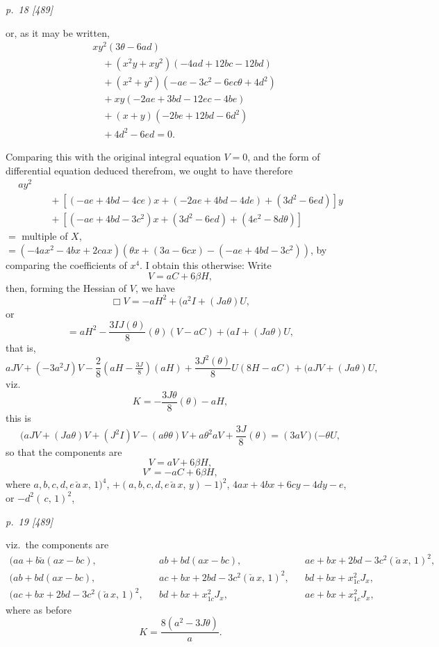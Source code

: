 ﻿\documentclass[11pt,a4paper]{article}
\theoremstyle{plain}
\theoremstyle{definition}
\begin{document}
\clearpage

\bigskip
\textit{p.~18 [489]}
\smallskip

or, as it may be written,
\begin{align*}
&xy^2(3\theta - 6ad)\\
&\quad + (x^2y+xy^2)(-4ad + 12bc - 12bd)\\
&\quad + (x^2+y^2)(-ae - 3c^2 - 6ec\theta + 4d^2)\\
&\quad + xy(-2ae+3bd - 12ec - 4be)\\
&\quad + (x+y)(-2be+ 12bd - 6d^2)\\
&\quad + 4d^2 - 6ed = 0.
\end{align*}

Comparing this with the original integral equation $V = 0$, and the form of differential
equation deduced therefrom, we ought to have therefore
\begin{align*}
[(4b^2 - 8ad)x^2 + (-2ae + 4bd)x &+ (-ae + 4bd - 3c^2)]ay^2\\
&\quad + [(-ae + 4bd - 4ce)x + (-2ae + 4bd - 4de) + (3d^2 - 6ed)] y\\
&\quad + [(-ae + 4bd - 3c^2)x + (3d^2 - 6ed) + (4e^2 - 8d\theta)]
\end{align*}
$=$ multiple of $X$,
\\
$=(-4ax^2 - 4bx + 2cax)(\theta x + (3a-6cx) - (-ae + 4bd - 3c^2))$,
by comparing the coefficients of $x^4$.
I obtain this otherwise:
Write
\[
V = aC + 6\beta H,
\]
then, forming the Hessian of $V$, we have
\[
\Box V = -aH^2 + (a^2I + (Ja\theta) U,
\]
or
\[
= aH^2 - \frac{3IJ(\theta)}{8}(\theta) (V - aC) + (aI + (Ja\theta) U,
\]
that is,
\[
aJV + (-3a^2J)V - \frac{2}{8}(aH - \tfrac{3J}{8})(aH) + \frac{3J^2(\theta)}{8} U(8H - aC) + (aJV + (Ja\theta) U,
\]
viz.
\[
K = -\frac{3J\theta}{8}(\theta) - aH,
\]
this is
\[
(aJV + (Ja\theta)V + (J^2I)V - (a\theta\theta)V + a\theta^2 a V + \frac{3J}{8}(\theta) = (3aV)(- \theta U,
\]
so that the components are
\[
V = aV + 6\beta H,
\]
\[
V' = -aC + 6\beta H,
\]
where $a, b, c, d, e\,\check{a}\,x,\,1)^4$,
$+(a, b, c, d, e\,\check{a}\,x,\,y) - 1)^2$, $4ax + 4bx + 6cy - 4dy - e$, or $-d^2(\,c,\,1)^2$,

\clearpage

\bigskip
\textit{p.~19 [489]}
\smallskip

viz.\ the components are
\begin{align*}
(aa+b\check{a}(ax-bc), && ab+bd(ax-bc), && ae+bx+2bd-3c^2(\check{a}\,x,\,1)^2,\\
(ab+bd(ax-bc), && ac+bx+2bd-3c^2(\check{a}\,x,\,1)^2, && bd+bx+x_{1c}^2J_x,\\
(ac+bx+2bd-3c^2(\check{a}\,x,\,1)^2, && bd+bx+x_{1c}^2J_x, && ae+bx+x_{1c}^2J_x,
\end{align*}
where as before
\[
K = \frac{8(a^2 - 3J\theta)}{a}.
\]
\end{document}
